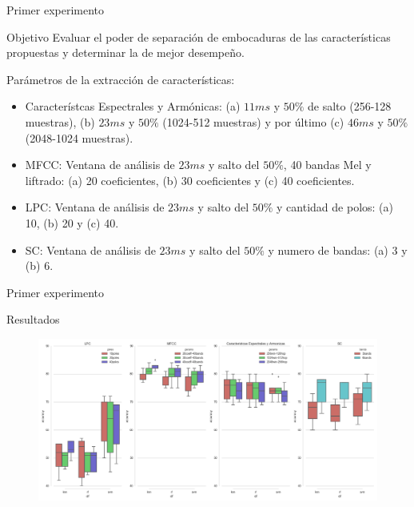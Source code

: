 \documentclass[aspectratio=169]{beamer}
\begin{document}
\begin{frame}{Primer experimento}
\begin{block}{Objetivo}
Evaluar el poder de separación de embocaduras de las características propuestas y determinar la de mejor desempeño.
\end{block}
\begin{block}{Parámetros de la extracción de características:}
\begin{itemize}
	\item Característcas Espectrales y Armónicas: (a) $11ms$ y $50\%$ de salto (256-128 muestras), (b) $23ms$ y $50\%$  (1024-512 muestras) y por último (c) $46ms$ y $50\%$  (2048-1024 muestras).
	\item MFCC: Ventana de análisis de $23ms$ y salto del $50\%$, 40 bandas Mel y liftrado: (a) 20 coeficientes, (b) 30 coeficientes y (c) 40 coeficientes.
	\item LPC: Ventana de análisis de $23ms$ y salto del $50\%$ y cantidad de polos: (a) 10, (b) 20 y (c) 40.
	\item SC: Ventana de análisis de $23ms$ y salto del $50\%$ y numero de bandas: (a) 3 y (b) 6.
\end{itemize}
\end{block}
\end{frame}

\begin{frame}{Primer experimento}
\begin{block}{Resultados}
\begin{figure}[H]
\begin{center}
\includegraphics[width=1\textwidth]{exp1_comparacion} 
\end{center}
\end{figure}
\end{block}

\end{frame}
\end{document}
